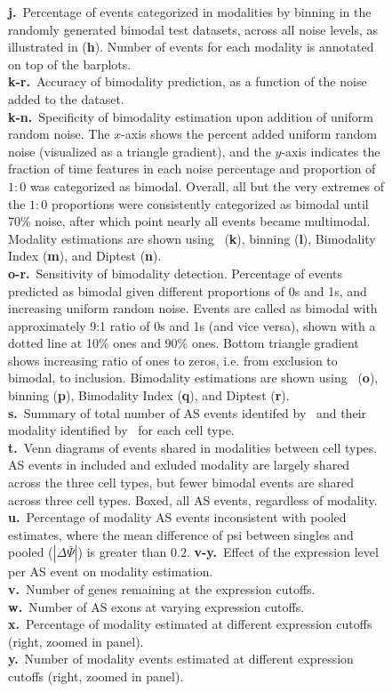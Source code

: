 \begin{figure}[h]
{\textbf{j.}~Percentage of events categorized in modalities by binning in the randomly generated bimodal test datasets, across all noise levels, as illustrated in (\textbf{h}). Number of events for each modality is annotated on top of the barplots. \\
\textbf{k-r.}~Accuracy of bimodality prediction, as a function of the noise added to the dataset. \\
\textbf{k-n.}~Specificity of bimodality estimation upon addition of uniform random noise. The $x$-axis shows the percent added uniform random noise (visualized as a triangle gradient), and the $y$-axis indicates the fraction of time features in each noise percentage and proportion of $1:0$ was categorized as bimodal. Overall, all but the very extremes of the $1:0$ proportions were consistently categorized as bimodal until 70\% noise, after which point nearly all events became multimodal. Modality estimations are shown using \anchor\, (\textbf{k}), binning (\textbf{l}), Bimodality Index (\textbf{m}), and Diptest (\textbf{n}).\\
\textbf{o-r.}~Sensitivity of bimodality detection. Percentage of events predicted as bimodal given different proportions of 0s and 1s, and increasing uniform random noise. Events are called as bimodal with approximately 9:1 ratio of 0s and 1s (and vice versa), shown with a dotted line at 10\% ones and 90\% ones. Bottom triangle gradient shows increasing ratio of ones to zeros, i.e. from exclusion to bimodal, to inclusion. Bimodality estimations are shown using \anchor\, (\textbf{o}), binning (\textbf{p}), Bimodality Index (\textbf{q}), and Diptest (\textbf{r}).\\
\textbf{s.}~Summary of total number of AS events identifed by \outrigger\, and their modality identified by \anchor\, for each cell type.\\
\textbf{t.}~Venn diagrams of events shared in modalities between cell types. AS events in included and exluded modality are largely shared across the three cell types, but fewer bimodal events are shared across three cell types. Boxed, all AS events, regardless of modality.\\
\textbf{u.}~Percentage of modality AS events inconsistent with pooled estimates, where the mean difference of psi between singles and pooled ($|\Delta\bar{\Psi}|$) is greater than $0.2$.
\textbf{v-y.}~Effect of the expression level per AS event on modality estimation.\\
\textbf{v.}~Number of genes remaining at the expression cutoffs.\\
\textbf{w.}~Number of AS exons at varying expression cutoffs.\\
\textbf{x.}~Percentage of modality estimated at different expression cutoffs (right, zoomed in panel).\\
\textbf{y.}~Number of modality events estimated at different expression cutoffs (right, zoomed in panel).\\
}
\label{fig:anchor}
\end{figure}





